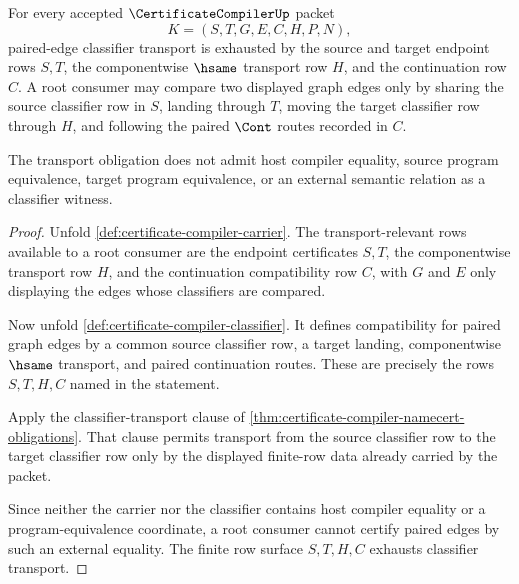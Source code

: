 \begin{theorem}
\label{thm:certificate-compiler-root-classifier-transport-obligation}
For every accepted $\CertificateCompilerUp$ packet
$$
K=(S,T,G,E,C,H,P,N),
$$
paired-edge classifier transport is exhausted by the source and target
endpoint rows $S,T$, the componentwise $\hsame$ transport row $H$, and the
continuation row $C$. A root consumer may compare two displayed graph edges
only by sharing the source classifier row in $S$, landing through $T$, moving
the target classifier row through $H$, and following the paired $\Cont$ routes
recorded in $C$.

The transport obligation does not admit host compiler equality, source program
equivalence, target program equivalence, or an external semantic relation as a
classifier witness.
\end{theorem}
\begin{proof}
Unfold \autoref{def:certificate-compiler-carrier}. The transport-relevant rows
available to a root consumer are the endpoint certificates $S,T$, the
componentwise transport row $H$, and the continuation compatibility row $C$,
with $G$ and $E$ only displaying the edges whose classifiers are compared.

Now unfold \autoref{def:certificate-compiler-classifier}. It defines
compatibility for paired graph edges by a common source classifier row, a
target landing, componentwise $\hsame$ transport, and paired continuation
routes. These are precisely the rows $S,T,H,C$ named in the statement.

Apply the classifier-transport clause of
\autoref{thm:certificate-compiler-namecert-obligations}. That clause permits
transport from the source classifier row to the target classifier row only by
the displayed finite-row data already carried by the packet.

Since neither the carrier nor the classifier contains host compiler equality
or a program-equivalence coordinate, a root consumer cannot certify paired
edges by such an external equality. The finite row surface $S,T,H,C$ exhausts
classifier transport.
\end{proof}


